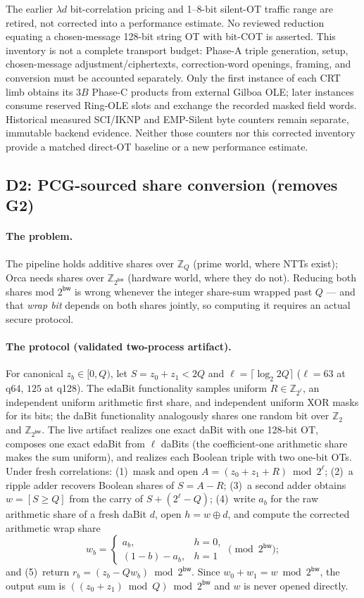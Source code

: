 \documentclass[11pt]{article}
\newcommand{\Z}{\mathbb{Z}}
\newcommand{\bw}{\mathsf{bw}}
\newcommand{\modtwo}{\Z_{2^{\bw}}}
\newcommand{\Q}{Q}   %
\begin{document}
The earlier $\lambda d$ bit-correlation pricing and 1--8-bit silent-OT
traffic range are retired, not corrected into a performance estimate.
No reviewed reduction equating a chosen-message 128-bit string OT with
bit-COT is asserted. This inventory is not a complete transport budget:
Phase-A triple generation, setup, chosen-message adjustment/ciphertexts,
correction-word openings, framing, and conversion must be accounted
separately. Only the first instance of each CRT limb obtains its $3B$
Phase-C products from external Gilboa OLE; later instances consume reserved
Ring-OLE slots and exchange the recorded masked field words.
Historical measured SCI/IKNP and EMP-Silent byte counters remain separate,
immutable backend evidence. Neither those counters nor this corrected
inventory provide a matched direct-OT baseline or a new performance estimate.

\subsection{D2: PCG-sourced share conversion (removes G2)}
\label{sec:design-convert}

\paragraph{The problem.} The pipeline holds additive shares over $\Z_\Q$
(prime world, where NTTs exist); Orca needs shares over $\modtwo$ (hardware
world, where they do not). Reducing both shares mod $2^{\bw}$ is wrong
whenever the integer share-sum wrapped past $\Q$ --- and that \emph{wrap bit}
depends on both shares jointly, so computing it requires an actual secure
protocol.

\paragraph{The protocol (validated two-process artifact).} For canonical
$z_b\in[0,\Q)$, let $S=z_0+z_1<2\Q$ and
$\ell=\lceil\log_2 2\Q\rceil$ ($\ell{=}63$ at q64, $125$ at q128).
The edaBit functionality samples uniform $R\in\Z_{2^\ell}$, an independent
uniform arithmetic first share, and independent uniform XOR masks for its
bits; the daBit functionality analogously shares one random bit over
$\Z_2$ and $\Z_{2^\bw}$. The live artifact realizes one exact daBit with one
128-bit OT, composes one exact edaBit from $\ell$ daBits (the coefficient-one
arithmetic share makes the sum uniform), and realizes each Boolean triple
with two one-bit OTs. Under fresh correlations: (1)~mask and open
$A=(z_0+z_1+R)\bmod 2^\ell$; (2)~a ripple adder recovers Boolean shares of
$S=A-R$; (3)~a second adder obtains
$w=[S\ge\Q]$ from the carry of $S+(2^\ell-\Q)$;
(4)~write $a_b$ for the raw arithmetic share of a fresh daBit $d$,
open $h=w\oplus d$, and compute the corrected arithmetic wrap share
\[
 w_b=\begin{cases}
 a_b,&h=0,\\
 (1-b)-a_b,&h=1
 \end{cases}\pmod{2^\bw};
\]
and (5)~return $r_b=(z_b-\Q w_b)\bmod2^\bw$.
Since $w_0+w_1=w\bmod2^\bw$, the output sum is
$((z_0+z_1)\bmod\Q)\bmod2^\bw$ and $w$ is never opened directly.
\end{document}
